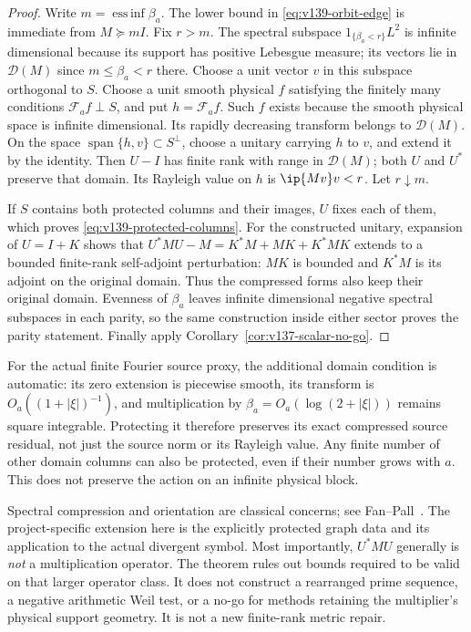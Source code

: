 \begin{proof}
Write $m=\operatorname*{ess\,inf}\beta_a$. The lower bound in
\eqref{eq:v139-orbit-edge} is immediate from $M\succeq mI$.
Fix $r>m$. The spectral subspace $1_{\{\beta_a<r\}}L^2$ is
infinite dimensional because its support has positive Lebesgue measure;
its vectors lie in $\mathcal D(M)$ since $m\le\beta_a<r$ there.
Choose a unit vector $v$ in this subspace orthogonal to $S$.
Choose a unit smooth physical $f$ satisfying the finitely many
conditions $\mathcal F_af\perp S$, and put $h=\mathcal F_af$.
Such $f$ exists because the smooth physical space is infinite
dimensional. Its rapidly decreasing transform belongs to
$\mathcal D(M)$. On the space $\operatorname{span}\{h,v\}\subset
S^\perp$, choose a unitary carrying $h$ to $v$, and extend it by the
identity. Then $U-I$ has finite rank with range in $\mathcal D(M)$;
both $U$ and $U^*$ preserve that domain. Its Rayleigh value on $h$
is $\ip{Mv}v<r$. Let $r\downarrow m$.

If $S$ contains both protected columns and their images, $U$ fixes
each of them, which proves \eqref{eq:v139-protected-columns}.
For the constructed unitary, expansion of $U=I+K$ shows that
$U^*MU-M=K^*M+MK+K^*MK$ extends to a bounded finite-rank
self-adjoint perturbation: $MK$ is bounded and $K^*M$ is its
adjoint on the original domain. Thus the compressed forms also
keep their original domain. Evenness of $\beta_a$ leaves infinite
dimensional negative spectral subspaces in each parity, so the same
construction inside either sector proves the parity statement.
Finally apply Corollary~\ref{cor:v137-scalar-no-go}.
\end{proof}

For the actual finite Fourier source proxy, the additional domain
condition is automatic: its zero extension is piecewise smooth,
its transform is $O_a((1+|\xi|)^{-1})$, and multiplication by
$\beta_a=O_a(\log(2+|\xi|))$ remains square integrable. Protecting
it therefore preserves its exact compressed source residual, not
just the source norm or its Rayleigh value. Any finite number of
other domain columns can also be protected, even if their number
grows with $a$. This does not preserve the action on an infinite
physical block.

Spectral compression and orientation are classical concerns; see
Fan--Pall~\cite{FanPall1957}. The project-specific extension here is
the explicitly protected graph data and its application to the
actual divergent symbol. Most importantly, $U^*MU$ generally is
\emph{not} a multiplication operator. The theorem rules out bounds
required to be valid on that larger operator class. It does not
construct a rearranged prime sequence, a negative arithmetic Weil
test, or a no-go for methods retaining the multiplier's physical
support geometry. It is not a new finite-rank metric repair.

